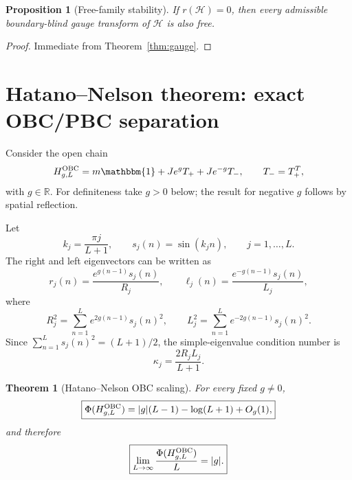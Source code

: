 \documentclass[reprint,amsmath,amssymb,aps,nofootinbib]{revtex4-2}
\newtheorem{theorem}{Theorem}
\newtheorem{proposition}{Proposition}
\newcommand{\id}{\mathbbm{1}}
\newcommand{\PhiC}{\Phi}
\begin{document}
\begin{proposition}[Free-family stability]
If \(r(\mathscr H)=0\), then every admissible boundary-blind gauge transform of
\(\mathscr H\) is also free.
\end{proposition}

\begin{proof}
Immediate from Theorem~\ref{thm:gauge}.
\end{proof}

\section{Hatano--Nelson theorem: exact OBC/PBC separation}
\label{sec:HN}

Consider the open chain
\begin{equation}
H_{g,L}^{\rm OBC}
=m\id+Je^gT_++Je^{-g}T_-,
\qquad T_-=T_+^T,
\label{eq:HN}
\end{equation}
with \(g\in\mathbb R\). For definiteness take $g>0$ below; the result for
negative $g$ follows by spatial reflection.

Let
\begin{equation}
 k_j=\frac{\pi j}{L+1},
\qquad
 s_j(n)=\sin(k_j n),
\qquad j=1,\ldots,L.
\end{equation}
The right and left eigenvectors can be written as
\begin{equation}
 r_j(n)=\frac{e^{g(n-1)}s_j(n)}{R_j},
 \qquad
 \ell_j(n)=\frac{e^{-g(n-1)}s_j(n)}{L_j},
\end{equation}
where
\begin{equation}
R_j^2=\sum_{n=1}^L e^{2g(n-1)}s_j(n)^2,
\qquad
L_j^2=\sum_{n=1}^L e^{-2g(n-1)}s_j(n)^2.
\end{equation}
Since
\(\sum_{n=1}^Ls_j(n)^2=(L+1)/2\), the simple-eigenvalue condition number is
\begin{equation}
\kappa_j
=\frac{2R_jL_j}{L+1}.
\label{eq:HN-kappa}
\end{equation}

\begin{theorem}[Hatano--Nelson OBC scaling]
\label{thm:HN-OBC}
For every fixed $g\ne0$,
\begin{equation}
\boxed{
\PhiC(H_{g,L}^{\rm OBC})
=|g|(L-1)-\log(L+1)+O_g(1),
}
\label{eq:HN-asymptotic}
\end{equation}
and therefore
\begin{equation}
\boxed{
\lim_{L\to\infty}\frac{\PhiC(H_{g,L}^{\rm OBC})}{L}=|g|.
}
\end{equation}
\end{theorem}
\end{document}
